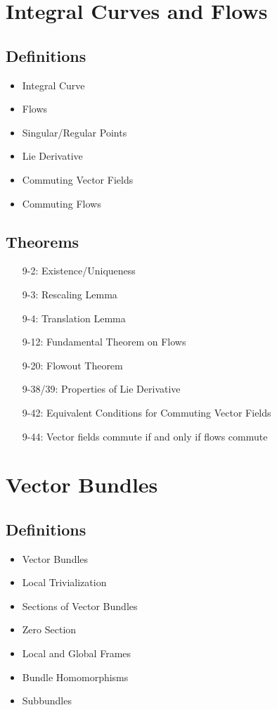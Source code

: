 \documentclass[11.5pt]{scrartcl}
\newcommand{\<}{\langle}
\renewcommand{\>}{\rangle}
\begin{document}
\section{Integral Curves and Flows}
\subsection{Definitions}
\begin{itemize}
\item Integral Curve
\item Flows
\item Singular/Regular Points
\item Lie Derivative
\item Commuting Vector Fields
\item Commuting Flows
\end{itemize}
\subsection{Theorems}
\begin{itemize}
\item[9-2:] Existence/Uniqueness
\item[9-3:] Rescaling Lemma
\item[9-4:] Translation Lemma 
\item[9-12:] Fundamental Theorem on Flows
\item[9-20:] Flowout Theorem
\item[9-38/39:] Properties of Lie Derivative
\item[9-42:] Equivalent Conditions for Commuting Vector Fields
\item[9-44:] Vector fields commute if and only if flows commute
\end{itemize}
\section{Vector Bundles}
\subsection{Definitions}
\begin{itemize}
\item Vector Bundles
\item Local Trivialization
\item Sections of Vector Bundles
\item Zero Section
\item Local and Global Frames
\item Bundle Homomorphisms
\item Subbundles
\end{itemize}
\end{document}
